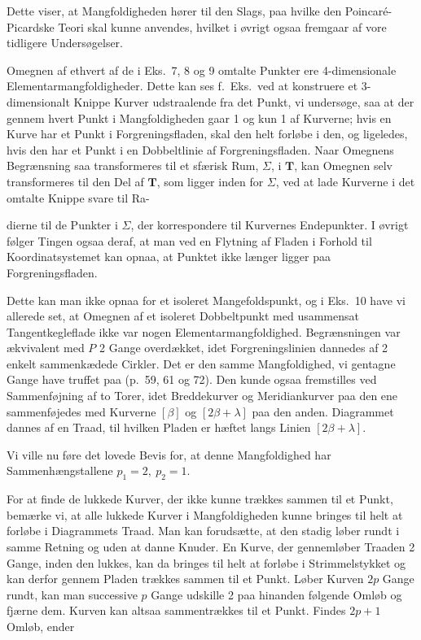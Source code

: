 \documentclass{article}
\begin{document}
Dette viser, at Mangfoldigheden hører til den Slags, paa hvilke den Poincaré-Picardske Teori skal kunne anvendes, hvilket i øvrigt ogsaa fremgaar af vore tidligere Undersøgelser.

Omegnen af ethvert af de i Eks.\ 7, 8 og 9 omtalte Punkter ere 4-dimensionale Elementarmangfoldigheder. Dette kan ses f.\ Eks.\ ved at konstruere et 3-dimensionalt Knippe Kurver udstraalende fra det Punkt, vi undersøge, saa at der gennem hvert Punkt i Mangfoldigheden gaar 1 og kun 1 af Kurverne; hvis en Kurve har et Punkt i Forgreningsfladen, skal den helt forløbe i den, og ligeledes, hvis den har et Punkt i en Dobbeltlinie af Forgreningsfladen. Naar Omegnens Begrænsning saa transformeres til et sfærisk Rum, $\Sigma$, i $\mathbf{T}$, kan Omegnen selv transformeres til den Del af $\mathbf{T}$, som ligger inden for $\Sigma$, ved at lade Kurverne i det omtalte Knippe svare til Ra-

dierne til de Punkter i $\Sigma$, der korrespondere til Kurvernes Endepunkter. I øvrigt følger Tingen ogsaa deraf, at man ved en Flytning af Fladen i Forhold til Koordinatsystemet kan opnaa, at Punktet ikke længer ligger paa Forgreningsfladen.

Dette kan man ikke opnaa for et isoleret Mangefoldspunkt, og i Eks.\ 10 have vi allerede set, at Omegnen af et isoleret Dobbeltpunkt med usammensat Tangentkegleflade ikke var nogen Elementarmangfoldighed. Begrænsningen var ækvivalent med $P$ 2 Gange overdækket, idet Forgreningslinien dannedes af 2 enkelt sammenkædede Cirkler. Det er den samme Mangfoldighed, vi gentagne Gange have truffet paa (p.\ 59, 61 og 72). Den kunde ogsaa fremstilles ved Sammenføjning af to Torer, idet Breddekurver og Meridiankurver paa den ene sammenføjedes med Kurverne $[\beta]$ og $[2\beta + \lambda]$ paa den anden. Diagrammet dannes af en Traad, til hvilken Pladen er hæftet langs Linien $[2\beta + \lambda]$.

Vi ville nu føre det lovede Bevis for, at denne Mangfoldighed har Sammenhængstallene $p_1 = 2, \ p_2 = 1$.

For at finde de lukkede Kurver, der ikke kunne trækkes sammen til et Punkt, bemærke vi, at alle lukkede Kurver i Mangfoldigheden kunne bringes til helt at forløbe i Diagrammets Traad. Man kan forudsætte, at den stadig løber rundt i samme Retning og uden at danne Knuder. En Kurve, der gennemløber Traaden 2 Gange, inden den lukkes, kan da bringes til helt at forløbe i Strimmelstykket og kan derfor gennem Pladen trækkes sammen til et Punkt. Løber Kurven $2p$ Gange rundt, kan man successive $p$ Gange udskille 2 paa hinanden følgende Omløb og fjærne dem. Kurven kan altsaa sammentrækkes til et Punkt. Findes $2p + 1$ Omløb, ender
\end{document}
